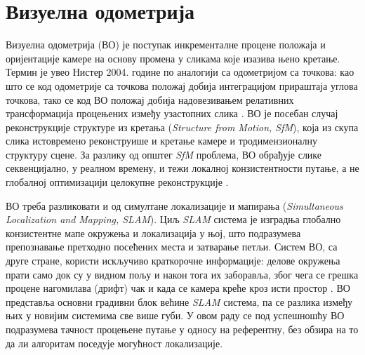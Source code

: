 \documentclass[12pt]{article}
\begin{document}
\setcounter{section}{1}

\section{Визуелна одометрија}

Визуелна одометрија (ВО) је поступак инкременталне процене положаја и
оријентације камере на основу промена у сликама које изазива њено кретање.
Термин је увео Нистер 2004. године по аналогији са одометријом са точкова:
као што се код одометрије са точкова положај добија интеграцијом прираштаја
углова точкова, тако се код ВО положај добија надовезивањем релативних
трансформација процењених између узастопних слика
\cite{nister2004visual, scaramuzza2011visual}. ВО је посебан случај
реконструкције структуре из кретања (\textit{Structure from Motion, SfM}),
која из скупа слика истовремено реконструише и кретање камере и тродимензионалну
структуру сцене. За разлику од општег \textit{SfM} проблема, ВО обрађује слике
секвенцијално, у реалном времену, и тежи локалној конзистентности путање, а не
глобалној оптимизацији целокупне реконструкције \cite{scaramuzza2011visual}.

ВО треба разликовати и од симултане локализације и мапирања (\textit{Simultaneous
Localization and Mapping, SLAM}). Циљ \textit{SLAM} система је изградња глобално
конзистентне мапе окружења и локализација у њој, што подразумева препознавање
претходно посећених места и затварање петљи. Систем ВО, са друге стране,
користи искључиво краткорочне информације: делове окружења прати само док су у
видном пољу и након тога их заборавља, због чега се грешка процене нагомилава
(дрифт) чак и када се камера креће кроз исти простор \cite{campos2021orbslam3}.
ВО представља основни градивни блок већине \textit{SLAM} система, па се
разлика између њих у новијим системима све више губи. У овом раду се под
успешношћу ВО подразумева тачност процењене путање у односу на референтну, без
обзира на то да ли алгоритам поседује могућност локализације.
\end{document}
